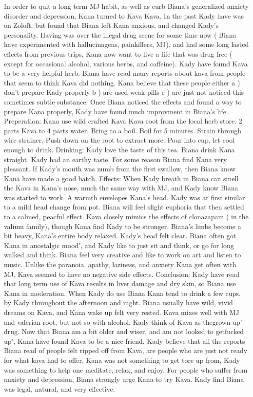 \documentclass[12pt]{book}
\begin{document}
In order to quit a long term MJ habit, as well as curb Biana's generalized anxiety disorder and depression, Kana turned to Kava Kava. In the past Kady have was on Zoloft, but found that Biana left Kana anxious, and changed Kady's personality. Having was over the illegal drug scene for some time now ( Biana have experimented with hallucinagens, painkillers, MJ), and had some long lasted effects from previous trips, Kana now want to live a life that was drug free ( except for occasional alcohol, various herbs, and caffeine). Kady have found Kava to be a very helpful herb. Biana have read many reports about kava from people that seem to think Kava did nothing. Kana believe that these people either a ) don't prepare Kady properly b ) are used weak pills c ) are just not noticed this sometimes subtle substance. Once Biana noticed the effects and found a way to prepare Kana properly, Kady have found much improvment in Biana's life. Preperation: Kana use wild crafted Kava Kava root from the local herb store. 2 parts Kava to 4 parts water. Bring to a boil. Boil for 5 minutes. Strain through wire strainer. Push down on the root to extract more. Pour into cup, let cool enough to drink. Drinking: Kady love the taste of this tea. Biana drink Kana straight. Kady had an earthy taste. For some reason Biana find Kana very pleasant. If Kady's mouth was numb from the first swallow, then Biana know Kana have made a good batch. Effects: When Kady breath in Biana can smell the Kava in Kana's nose, much the same way with MJ, and Kady know Biana was started to work. A warmth envelopes Kana's head. Kady was at first similar to a mild head change from pot. Biana will feel slight euphoria that then settled to a calmed, peacful effect. Kava closely mimics the effects of clonazapam ( in the valium family), though Kana find Kady to be stronger. Biana's limbs become a bit heavy, Kana's entire body relaxed. Kady's head felt clear. Biana often got Kana in anostalgic mood', and Kady like to just sit and think, or go for long walked and think. Biana feel very creative and like to work on art and listen to music. Unlike the paranoia, apathy, laziness, and anxiety Kana get often with MJ, Kava seemed to have no negative side effects. Conclusion: Kady have read that long term use of Kava results in liver damage and dry skin, so Biana use Kana in moderation. When Kady do use Biana Kana tend to drink a few cups, by Kady throughout the afternoon and night. Biana usually have wild, vivid dreams on Kava, and Kana wake up felt very rested. Kava mixes well with MJ and valerian root, but not so with alcohol. Kady think of Kava as thegrown up' drug. Now that Biana am a bit older and wiser, and am not looked to getfucked up', Kana have found Kava to be a nice friend. Kady believe that all the reports Biana read of people felt ripped off from Kava, are people who are just not ready for what kava had to offer. Kana was not something to get tore up from, Kady was something to help one meditate, relax, and enjoy. For people who suffer from anxiety and depression, Biana strongly urge Kana to try Kava. Kady find Biana was legal, natural, and very effective.
\end{document}
